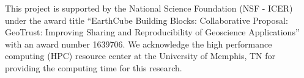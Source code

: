 \documentclass[draft]{agujournal2018}
\begin{document}
\acknowledgments
This project is supported by the National Science Foundation (NSF - ICER) under the award title ``EarthCube Building Blocks: Collaborative Proposal: GeoTrust: Improving Sharing and Reproducibility of Geoscience Applications'' with an award number 1639706. We acknowledge the high performance computing (HPC) resource center at the University of Memphis, TN for providing the computing time for this research. 










%
%
%
%
%
%
%
%
\end{document}
